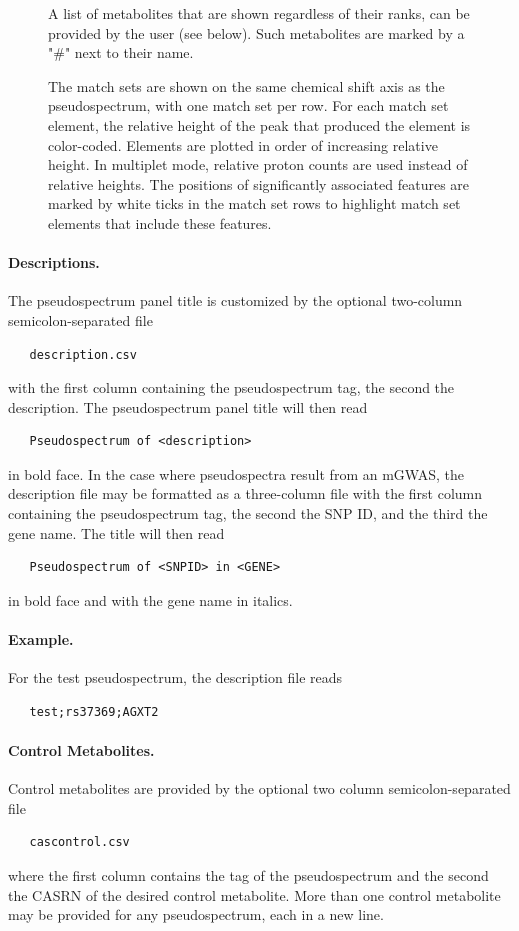 \documentclass[a4paper,11pt]{article}
\begin{document}
\begin{figure}
{\begin{description}[align=left,noitemsep,labelwidth=7.2mm]
\item[F.] A list of metabolites that are shown regardless of their ranks, can be provided by the user (see below). Such metabolites are marked by a "\#" next to their name.
\item[G, H.] The match sets are shown on the same chemical shift axis as the pseudospectrum, with one match set per row. For each match set element, the relative height of the peak that produced the element is color-coded. Elements are plotted in order of increasing relative height. In multiplet mode, relative proton counts are used instead of relative heights. The positions of significantly associated features are marked by white ticks in the match set rows to highlight match set elements that include these features.
\end{description} %
}
\end{figure}
\paragraph{Descriptions.} The pseudospectrum panel title is customized by the optional two-column semicolon-separated file
\begin{verbatim}
   description.csv
\end{verbatim}
with the first column containing the pseudospectrum tag, the second the description. The pseudospectrum panel title will then read
\begin{verbatim}
   Pseudospectrum of <description>
\end{verbatim}
in bold face. In the case where pseudospectra result from an mGWAS, the description file may be formatted as a three-column file with the first column containing the pseudospectrum tag, the second the SNP ID, and the third the gene name. The title will then read
\begin{verbatim}
   Pseudospectrum of <SNPID> in <GENE>
\end{verbatim}
in bold face and with the gene name in italics.
\paragraph{Example.} For the test pseudospectrum, the description file reads
\begin{verbatim}
   test;rs37369;AGXT2
\end{verbatim}
\paragraph{Control Metabolites.} Control metabolites are provided by the optional two column semicolon-separated file
\begin{verbatim}
   cascontrol.csv
\end{verbatim}
where the first column contains the tag of the pseudospectrum and the second the CASRN of the desired control metabolite. More than one control metabolite may be provided for any pseudospectrum, each in a new line.
\end{document}
